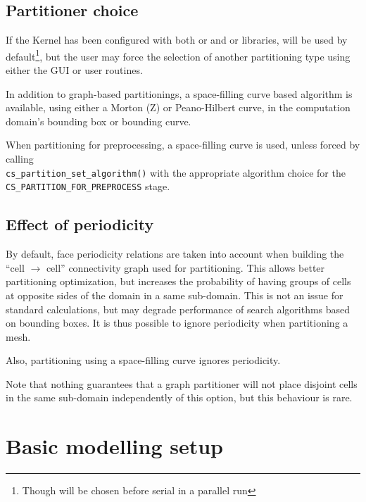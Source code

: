 {{{\subsection{Partitioner choice\label{sec:parall:part:partlib}}

If the Kernel has been configured with both \ptscotch or \scotch and
\parmetis or \metis libraries, \ptscotch will be used by default\footnote{
Though \parmetis will be chosen before serial \scotch in a parallel
run}, but the user may force the selection of another partitioning
type using either the GUI or user routines.

In addition to graph-based partitionings, a space-filling curve based
algorithm is available, using either a Morton (Z) or Peano-Hilbert
curve, in the computation domain's bounding box or bounding curve.

When partitioning for preprocessing, a space-filling curve is used,
unless forced by calling\\ \texttt{cs\_partition\_set\_algorithm()}
with the appropriate algorithm choice for the\\
\texttt{CS\_PARTITION\_FOR\_PREPROCESS} stage.

\subsection{Effect of periodicity\label{sec:parall:part:noperiod}}

By default, face periodicity relations are taken into account when building
the ``cell $\rightarrow$ cell'' connectivity graph used for partitioning.
This allows better partitioning optimization, but increases the probability
of having groups of cells at opposite sides of the domain in a same
sub-domain. This is not an issue for standard calculations, but may
degrade performance of search algorithms based on bounding boxes.
It is thus possible to ignore periodicity when partitioning a mesh.

Also, partitioning using a space-filling curve ignores periodicity.

Note that nothing guarantees that a graph partitioner will not place
disjoint cells in the same sub-domain independently of this option,
but this behaviour is rare.

\section{Basic modelling setup}

}}}
